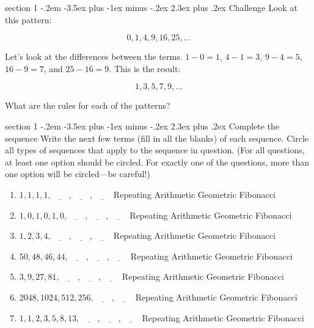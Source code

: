 \documentclass[12pt,letterpaper]{article}
\makeatletter
\newenvironment{problem}{\@startsection
       {section}
       {1}
       {-.2em}
       {-3.5ex plus -1ex minus -.2ex}
       {2.3ex plus .2ex}
       {\pagebreak[3]
       \large\bf\noindent{Problem }
       }
       }
\makeatother
\begin{document}
\begin{problem}{Challenge}
 Look at this pattern:
 
 \[
  0, 1, 4, 9, 16, 25, \ldots
 \]
 
 Let's look at the differences between the terms. $1-0=1$, $4-1=3$, $9-4=5$, $16-9=7$, and $25-16=9$.
 This is the result:
 
 \[
  1, 3, 5, 7, 9, \ldots
 \]
 
 What are the rules for each of the patterns?
\end{problem}

\begin{problem}{Complete the sequence}
 Write the next few terms (fill in all the blanks) of each sequence. Circle all types of sequences
 that apply to the sequence in question. (For all questions, at least one option should be circled.
 For exactly one of the questions, more than one option will be circled---be careful!)
 
 \begin{enumerate}
  \item $1, 1, 1, 1, \underline{\hspace{2em}}, \underline{\hspace{2em}}, \underline{\hspace{2em}}$
  \hfill Repeating Arithmetic Geometric Fibonacci
  \item $1, 0, 1, 0, 1, 0, \underline{\hspace{2em}}, \underline{\hspace{2em}}, \underline{\hspace{2em}}$
  \hfill Repeating Arithmetic Geometric Fibonacci
  \item $1, 2, 3, 4, \underline{\hspace{2em}}, \underline{\hspace{2em}}, \underline{\hspace{2em}}$
  \hfill Repeating Arithmetic Geometric Fibonacci
  \item $50, 48, 46, 44, \underline{\hspace{2em}}, \underline{\hspace{2em}}, \underline{\hspace{2em}}$
  \hfill Repeating Arithmetic Geometric Fibonacci
  \item $3, 9, 27, 81, \underline{\hspace{2em}}, \underline{\hspace{2em}}, \underline{\hspace{2em}}$
  \hfill Repeating Arithmetic Geometric Fibonacci
  \item $2048, 1024, 512, 256, \underline{\hspace{2em}}, \underline{\hspace{2em}}$
  \hfill Repeating Arithmetic Geometric Fibonacci
  \item $1, 1, 2, 3, 5, 8, 13, \underline{\hspace{2em}}, \underline{\hspace{2em}}, \underline{\hspace{2em}}$
  \hfill Repeating Arithmetic Geometric Fibonacci
 \end{enumerate}
\end{problem}
\end{document}
